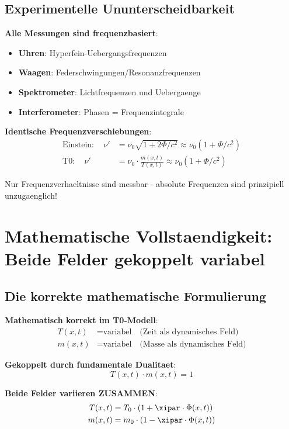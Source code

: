 	\subsection{Experimentelle Ununterscheidbarkeit}
	
	\textbf{Alle Messungen sind frequenzbasiert}:
	\begin{itemize}
		\item \textbf{Uhren}: Hyperfein-Uebergangsfrequenzen
		\item \textbf{Waagen}: Federschwingungen/Resonanzfrequenzen
		\item \textbf{Spektrometer}: Lichtfrequenzen und Uebergaenge
		\item \textbf{Interferometer}: Phasen = Frequenzintegrale
	\end{itemize}
	
	\textbf{Identische Frequenzverschiebungen}:
	\begin{align}
		\text{Einstein}: \quad \nu' &= \nu_0 \sqrt{1 + 2\Phi/c^2} \approx \nu_0 (1 + \Phi/c^2) \\
		\text{T0}: \quad \nu' &= \nu_0 \cdot \frac{m(x,t)}{T(x,t)} \approx \nu_0 (1 + \Phi/c^2)
	\end{align}
	
	Nur Frequenzverhaeltnisse sind messbar - absolute Frequenzen sind prinzipiell unzugaenglich!
	
	\section{Mathematische Vollstaendigkeit: Beide Felder gekoppelt variabel}
	
	\subsection{Die korrekte mathematische Formulierung}
	
	\textbf{Mathematisch korrekt im T0-Modell}:
	\begin{align}
		T(x,t) &= \text{variabel} \quad \text{(Zeit als dynamisches Feld)} \\
		m(x,t) &= \text{variabel} \quad \text{(Masse als dynamisches Feld)}
	\end{align}
	
	\textbf{Gekoppelt durch fundamentale Dualitaet}:
	\begin{equation}
		T(x,t) \cdot m(x,t) = 1
	\end{equation}
	
	\textbf{Beide Felder variieren ZUSAMMEN}:
	\begin{align}
		T(x,t) &= T_0 \cdot (1 + \xipar \cdot \Phi(x,t)) \\
		m(x,t) &= m_0 \cdot (1 - \xipar \cdot \Phi(x,t))
	\end{align}
	
